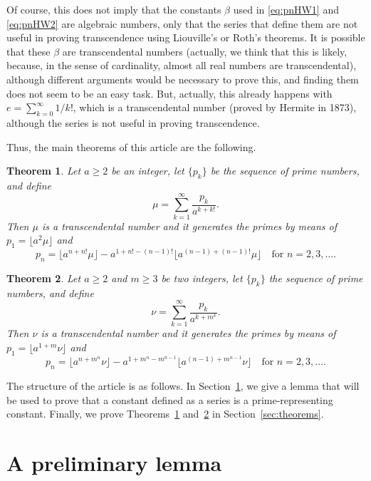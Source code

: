 \documentclass{article}
\theoremstyle{plain}
\newtheorem{theorem}{Theorem}
\begin{document}
Of course, this does not imply that the constants $\beta$ used in \eqref{eq:pnHW1} and \eqref{eq:pnHW2} are algebraic numbers, only that the series that define them are not useful in proving transcendence using Liouville's or Roth's theorems. 
It is possible that these $\beta$ are transcendental numbers (actually, we think that this is likely, because, in the sense of cardinality, almost all real numbers are transcendental), although different arguments would be necessary to prove this, and finding them does not seem to be an easy task. 
But, actually, this already happens with $e = \sum_{k=0}^\infty 1/k!$, which is a transcendental number (proved by Hermite in 1873), although the series is not useful in proving transcendence.

Thus, the main theorems of this article are the following.

\begin{theorem}
\label{thm:TL}
Let $a \ge 2$ be an integer, let $\{p_k\}$ be the sequence of prime numbers, and define
\[
  \mu = \sum_{k=1}^{\infty} \frac{p_k}{a^{k+k!}}.
\]
Then $\mu$ is a transcendental number and it generates the primes by means of $p_1 = \lfloor a^2 \mu \rfloor$ and
\begin{equation}
\label{eq:TL}
  p_n = \lfloor a^{n+n!} \mu \rfloor - a^{1 + n! - (n-1)!} \lfloor a^{(n-1)+(n-1)!} \mu \rfloor
  \quad \text{for } n=2,3,\dots.
\end{equation}
\end{theorem}

\begin{theorem}
\label{thm:TR}
Let $a \ge 2$ and $m \ge 3$ be two integers, let $\{p_k\}$ the sequence of prime numbers, and define
\[
  \nu = \sum_{k=1}^{\infty} \frac{p_k}{a^{k+m^k}}.
\]
Then $\nu$ is a transcendental number and it generates the primes by means of 
$p_1 = \lfloor a^{1+m} \nu \rfloor$ and
\begin{equation}
\label{eq:TR}
  p_n = \lfloor a^{n+m^{n}} \nu \rfloor - a^{1+m^n - m^{n-1}} \lfloor a^{(n-1)+m^{n-1}} \nu \rfloor 
  \quad \text{for } n=2,3,\dots.
\end{equation}
\end{theorem}

The structure of the article is as follows. In Section~\ref{sec:lemma}, we give a lemma that will be used to prove that a constant defined as a series is a prime-representing constant. Finally, we prove Theorems~\ref{thm:TL} and~\ref{thm:TR} in Section~\ref{sec:theorems}.

\section{A preliminary lemma}
\label{sec:lemma}
\end{document}
